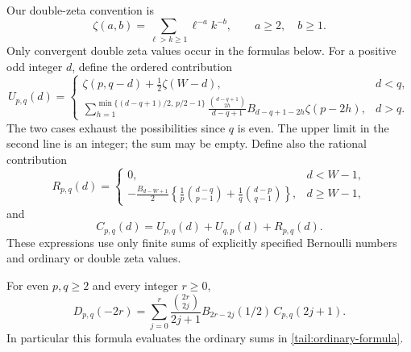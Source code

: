 Our double-zeta convention is
\[
 \zeta(a,b)=\sum_{\ell>k\ge1}\ell^{-a}k^{-b},
 \qquad a\ge2,\quad b\ge1.
\]
Only convergent double zeta values occur in the formulas below.
For a positive odd integer \(d\), define the ordered contribution
\begin{equation}\label{tail:ordered-block}
 U_{p,q}(d)=
 \begin{cases}
 \displaystyle
 \zeta(p,q-d)+\frac12\zeta(W-d),&d<q,\\[6pt]
 \displaystyle
 \sum_{h=1}^{\min\{(d-q+1)/2,\,p/2-1\}}
 \frac{\binom{d-q+1}{2h}}{d-q+1}
 B_{d-q+1-2h}\zeta(p-2h),&d>q.
 \end{cases}
\end{equation}
The two cases exhaust the possibilities since \(q\) is even.
The upper limit in the second line is an integer; the sum may be
empty. Define also the rational contribution
\begin{equation}\label{tail:rational-block}
 R_{p,q}(d)=
 \begin{cases}
 0,&d<W-1,\\[3pt]
 \displaystyle
 -\frac{B_{d-W+1}}2
 \left\{\frac1p\binom{d-q}{p-1}
          +\frac1q\binom{d-p}{q-1}\right\},&d\ge W-1,
 \end{cases}
\end{equation}
and
\begin{equation}\label{tail:block}
 C_{p,q}(d)=U_{p,q}(d)+U_{q,p}(d)+R_{p,q}(d).
\end{equation}
These expressions use only finite sums of explicitly specified
Bernoulli numbers and ordinary or double zeta values.

\begin{theorem}
\label{tail:all-moments}
For even \(p,q\ge2\) and every integer \(r\ge0\),
\begin{equation}\label{tail:moment-formula}
 \boxed{
 D_{p,q}(-2r)=
 \sum_{j=0}^{r}\frac{\binom{2r}{2j}}{2j+1}
 B_{2r-2j}(1/2)\,C_{p,q}(2j+1).}
\end{equation}
In particular this formula evaluates the ordinary sums in
\eqref{tail:ordinary-formula}.
\end{theorem}


